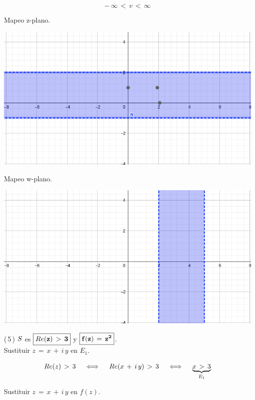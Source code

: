 \documentclass[a4paper,11pt,openany]{book}
\begin{document}
$$-\,\infty\,<\,v\,<\,\infty$$

\textcolor{ao(english)}{} Mapeo z-plano.

\begin{center}
     \includegraphics[width=15cm]{Mapeo-Ej-4-z}
\end{center}

\newpage

\textcolor{ao(english)}{} Mapeo w-plano.

\begin{center}
     \includegraphics[width=15cm]{Mapeo-Ej-4-w}
\end{center}

\textcolor{ao(english)}{(\,5\,)} $\mathnormal{S}$ es $\boxed{\bf{\mathnormal{Re}(z)\,>\,3}}$ y $\boxed{\bf{f(z)\,=\,z^{2}}}$.\\

\textcolor{ao(english)}{} Sustituir $z\,=\,x\,+\,i\,y$ en $E_{1}$.

$$\mathnormal{Re}(z)\,>\,3 \quad\iff\quad \mathnormal{Re}(x\,+\,i\,y)\,>\,3 \quad\iff\quad \underbrace{x\,>\,3}_{E_{1}}$$

\textcolor{ao(english)}{} Sustituir $z\,=\,x\,+\,i\,y$ en $f(z)$.
\end{document}

